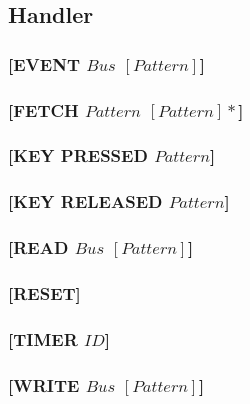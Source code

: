 \documentclass{scrartcl}
\begin{document}
\subsection{Handler}

\subsubsection{[EVENT $Bus$ $[Pattern]$]}

\subsubsection{[FETCH $Pattern$ $[Pattern]*$]}

\subsubsection{[KEY PRESSED $Pattern$]}

\subsubsection{[KEY RELEASED $Pattern$]}

\subsubsection{[READ $Bus$ $[Pattern]$]}

\subsubsection{[RESET]}

\subsubsection{[TIMER $ID$]}

\subsubsection{[WRITE $Bus$ $[Pattern]$]}
\end{document}
